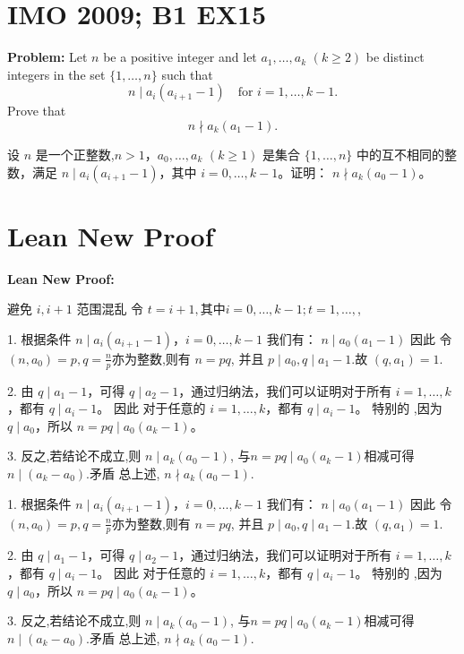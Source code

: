 \documentclass[a4paper]{article}
\begin{document}
\section*{IMO 2009; B1 EX15}
    \textbf{Problem:}
    Let $n$ be a positive integer and let $a_1,\ldots,a_k$ $(k \geq 2)$ be distinct integers in the set $\{1,\ldots,n\}$ such that 
    \[n \mid a_i(a_{i+1}-1) \quad \text{for } i = 1,\ldots,k-1.\]
    Prove that 
    \[n \nmid a_k(a_1-1).\]

    \[ \]
    设 $n$ 是一个正整数,$n > 1$，$a_0, \ldots, a_k$ $(k \geq 1)$ 是集合 $\{1, \ldots, n\}$ 中的互不相同的整数，满足
    $n \mid a_i(a_{i+1}-1)$，其中 $i = 0, \ldots, k-1$。证明：
    $n \nmid a_k(a_0-1)$。

\section*{Lean New Proof}
    \textbf{Lean New Proof:}

    避免 $i,i+1$ 范围混乱
    令 $t = i + 1,其中i = 0, \ldots, k-1; t = 1, \ldots, $,

    1. 根据条件 $n \mid a_i(a_{i+1}-1)$，$i = 0,\ldots,k-1$ 我们有：
    $n \mid a_0(a_1 - 1)$ 因此 令 $(n,a_0) = p,q =\frac{n}{p}$亦为整数,则有 $n = pq$,
    并且 $p \mid a_0,q \mid a_1 - 1$.故 $(q,a_1) = 1$.
    
    2. 由 $q \mid a_1 - 1$，可得 $q \mid a_2 - 1$，通过归纳法，我们可以证明对于所有 $i = 1, \ldots, k$，都有 $q \mid a_i - 1$。
    因此 对于任意的 $i = 1, \ldots, k$，都有 $q \mid a_i - 1$。
    特别的 ,因为 $q \mid a_0$，所以 $n = pq \mid a_0(a_k - 1)$。
    
    3. 反之,若结论不成立,则 $n \mid a_k(a_0 - 1)$, 与$n = pq \mid a_0(a_k - 1)$相减可得 $n \mid (a_k - a_0)$.矛盾
    总上述, $n \nmid a_k(a_0 - 1)$.
    



    1. 根据条件 $n \mid a_i(a_{i+1}-1)$，$i = 0,\ldots,k-1$ 我们有：
    $n \mid a_0(a_1 - 1)$ 因此 令 $(n,a_0) = p,q =\frac{n}{p}$亦为整数,则有 $n = pq$,
    并且 $p \mid a_0,q \mid a_1 - 1$.故 $(q,a_1) = 1$.
    
    2. 由 $q \mid a_1 - 1$，可得 $q \mid a_2 - 1$，通过归纳法，我们可以证明对于所有 $i = 1, \ldots, k$，都有 $q \mid a_i - 1$。
    因此 对于任意的 $i = 1, \ldots, k$，都有 $q \mid a_i - 1$。
    特别的 ,因为 $q \mid a_0$，所以 $n = pq \mid a_0(a_k - 1)$。
    
    3. 反之,若结论不成立,则 $n \mid a_k(a_0 - 1)$, 与$n = pq \mid a_0(a_k - 1)$相减可得 $n \mid (a_k - a_0)$.矛盾
    总上述, $n \nmid a_k(a_0 - 1)$.
\end{document}
